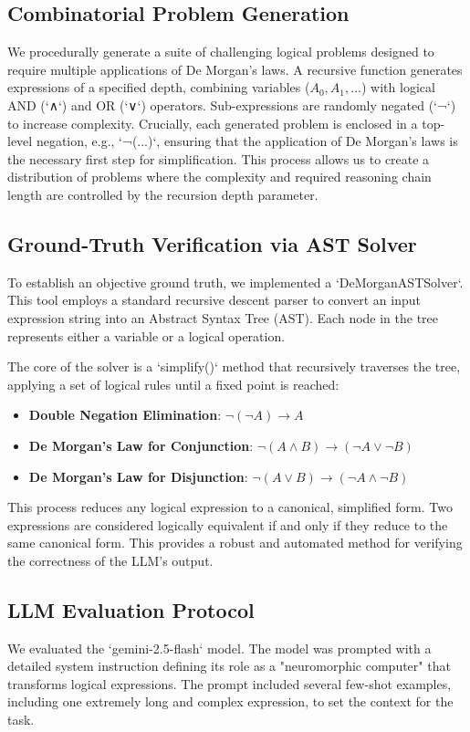 \documentclass[11pt,a4paper]{article}
\begin{document}
\subsection{Combinatorial Problem Generation}
We procedurally generate a suite of challenging logical problems designed to require multiple applications of De Morgan's laws. A recursive function generates expressions of a specified depth, combining variables ($A_0, A_1, \dots$) with logical AND (`∧`) and OR (`∨`) operators. Sub-expressions are randomly negated (`¬`) to increase complexity. Crucially, each generated problem is enclosed in a top-level negation, e.g., `¬(...)`, ensuring that the application of De Morgan's laws is the necessary first step for simplification. This process allows us to create a distribution of problems where the complexity and required reasoning chain length are controlled by the recursion depth parameter.

\subsection{Ground-Truth Verification via AST Solver}
To establish an objective ground truth, we implemented a `DeMorganASTSolver`. This tool employs a standard recursive descent parser to convert an input expression string into an Abstract Syntax Tree (AST). Each node in the tree represents either a variable or a logical operation.

The core of the solver is a `simplify()` method that recursively traverses the tree, applying a set of logical rules until a fixed point is reached:
\begin{itemize}
    \item \textbf{Double Negation Elimination}: $\neg(\neg A) \rightarrow A$
    \item \textbf{De Morgan's Law for Conjunction}: $\neg(A \land B) \rightarrow (\neg A \lor \neg B)$
    \item \textbf{De Morgan's Law for Disjunction}: $\neg(A \lor B) \rightarrow (\neg A \land \neg B)$
\end{itemize}
This process reduces any logical expression to a canonical, simplified form. Two expressions are considered logically equivalent if and only if they reduce to the same canonical form. This provides a robust and automated method for verifying the correctness of the LLM's output.

\subsection{LLM Evaluation Protocol}
We evaluated the `gemini-2.5-flash` model. The model was prompted with a detailed system instruction defining its role as a "neuromorphic computer" that transforms logical expressions. The prompt included several few-shot examples, including one extremely long and complex expression, to set the context for the task.
\end{document}
